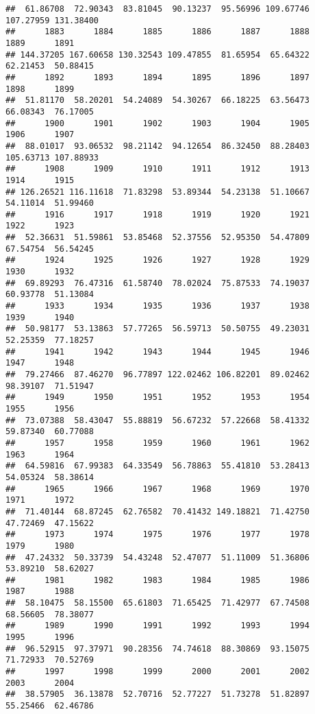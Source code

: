 \documentclass[
]{article}
\begin{document}
\begin{verbatim}
##  61.86708  72.90343  83.81045  90.13237  95.56996 109.67746 107.27959 131.38400 
##      1883      1884      1885      1886      1887      1888      1889      1891 
## 144.37205 167.60658 130.32543 109.47855  81.65954  65.64322  62.21453  50.88415 
##      1892      1893      1894      1895      1896      1897      1898      1899 
##  51.81170  58.20201  54.24089  54.30267  66.18225  63.56473  66.08343  76.17005 
##      1900      1901      1902      1903      1904      1905      1906      1907 
##  88.01017  93.06532  98.21142  94.12654  86.32450  88.28403 105.63713 107.88933 
##      1908      1909      1910      1911      1912      1913      1914      1915 
## 126.26521 116.11618  71.83298  53.89344  54.23138  51.10667  54.11014  51.99460 
##      1916      1917      1918      1919      1920      1921      1922      1923 
##  52.36631  51.59861  53.85468  52.37556  52.95350  54.47809  67.54754  56.54245 
##      1924      1925      1926      1927      1928      1929      1930      1932 
##  69.89293  76.47316  61.58740  78.02024  75.87533  74.19037  60.93778  51.13084 
##      1933      1934      1935      1936      1937      1938      1939      1940 
##  50.98177  53.13863  57.77265  56.59713  50.50755  49.23031  52.25359  77.18257 
##      1941      1942      1943      1944      1945      1946      1947      1948 
##  79.27466  87.46270  96.77897 122.02462 106.82201  89.02462  98.39107  71.51947 
##      1949      1950      1951      1952      1953      1954      1955      1956 
##  73.07388  58.43047  55.88819  56.67232  57.22668  58.41332  59.87340  60.77088 
##      1957      1958      1959      1960      1961      1962      1963      1964 
##  64.59816  67.99383  64.33549  56.78863  55.41810  53.28413  54.05324  58.38614 
##      1965      1966      1967      1968      1969      1970      1971      1972 
##  71.40144  68.87245  62.76582  70.41432 149.18821  71.42750  47.72469  47.15622 
##      1973      1974      1975      1976      1977      1978      1979      1980 
##  47.24332  50.33739  54.43248  52.47077  51.11009  51.36806  53.89210  58.62027 
##      1981      1982      1983      1984      1985      1986      1987      1988 
##  58.10475  58.15500  65.61803  71.65425  71.42977  67.74508  68.56605  78.38077 
##      1989      1990      1991      1992      1993      1994      1995      1996 
##  96.52915  97.37971  90.28356  74.74618  88.30869  93.15075  71.72933  70.52769 
##      1997      1998      1999      2000      2001      2002      2003      2004 
##  38.57905  36.13878  52.70716  52.77227  51.73278  51.82897  55.25466  62.46786 

\end{verbatim}
\end{document}
